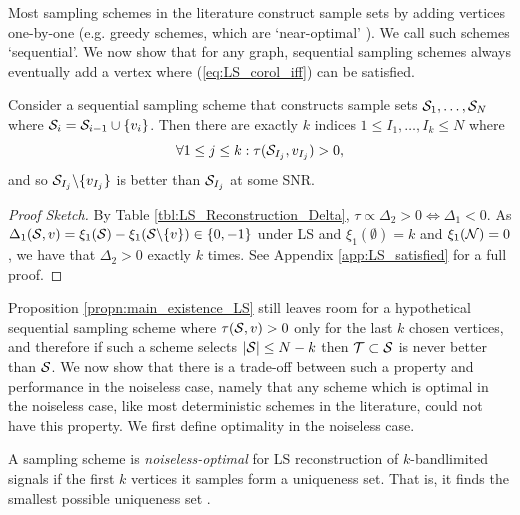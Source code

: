 Most sampling schemes in the literature  construct sample sets by adding vertices one-by-one (e.g. greedy schemes, which are `near-optimal' \cite{chamon2016near}). We call such schemes `sequential'. We now show that for any graph, sequential sampling schemes always eventually add a vertex where (\ref{eq:LS_corol_iff}) can be satisfied.


\begin{propn}
   \label{propn:main_existence_LS} 
   Consider a sequential sampling scheme that constructs sample sets $\mathcal{S}_{1}, \ldots, \mathcal{S}_{N}$ where $\mathcal{S}_{i} = \mathcal{S}_{i-1} \cup \{ v_{i} \}$. Then there are exactly $k$ indices $1 \leq I_{1}, \dots, I_{k} \leq N$ where
   \begin{equation}
        \forall 1\leq j \leq k: \tau(\mathcal{S}_{I_{j}}, v_{I_{j}}) > 0,
    \end{equation}
    and so $\mathcal{S}_{I_{j}} \backslash \{v_{I_{j}}\}$ is better than $\mathcal{S}_{I_{j}}$ at some SNR.
\end{propn}
\begin{proof}[Proof Sketch]
    By Table \ref{tbl:LS_Reconstruction_Delta}, $\tau \propto \Delta_{2} > 0 \iff \Delta_{1} < 0$. As $\Delta_{1}(\mathcal{S},v) = \xi_{1}(\mathcal{S}) - \xi_{1}(\mathcal{S}\backslash \{v\}) \in \{0,-1\}$ under LS and $\xi_{1}(\emptyset) = k$ and $\xi_{1}(\mathcal{N}) = 0$, we have that $\Delta_{2} > 0$ exactly $k$ times. See Appendix \ref{app:LS_satisfied} for a full proof.
\end{proof}
    Proposition \ref{propn:main_existence_LS} still leaves room for a hypothetical sequential sampling scheme where $\tau(\mathcal{S},v) > 0$ only for the last $k$ chosen vertices, and therefore if such a scheme selects $|\mathcal{S}| \leq N-k$ then $\mathcal{T} \subset \mathcal{S}$ is never better than $\mathcal{S}$. We now show that there is a trade-off between such a property and performance in the noiseless case, namely that
    any scheme which is optimal in the noiseless case, like most deterministic schemes in the literature, could not have this property. We first define optimality in the noiseless case.  %
    \begin{defn}
        A sampling scheme is \emph{noiseless-optimal} for LS reconstruction of $k$-bandlimited signals if the first $k$ vertices it samples form a uniqueness set. That is, it finds the smallest possible uniqueness set  \cite{shomorony2014sampling}.
    \end{defn}
    
